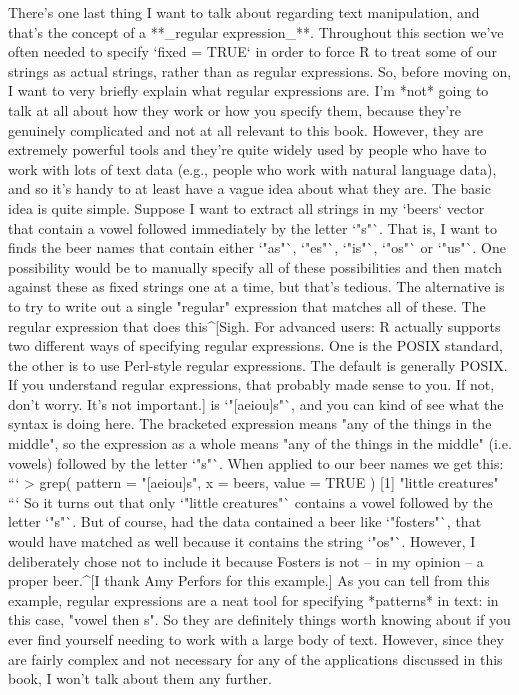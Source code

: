 There's one last thing I want to talk about regarding text manipulation, and that's the concept of a **_regular expression_**. Throughout this section we've often needed to specify `fixed = TRUE` in order to force R to treat some of our strings as actual strings, rather than as regular expressions. So, before moving on, I want to very briefly explain what regular expressions are. I'm *not* going to talk at all about how they work or how you specify them, because they're genuinely complicated and not at all relevant to this book. However, they are extremely powerful tools and they're quite widely used by people who have to work with lots of text data (e.g., people who work with natural language data), and so it's handy to at least have a vague idea about what they are. The basic idea is quite simple. Suppose I want to extract all strings in my `beers` vector that contain a vowel followed immediately by the letter `"s"`. That is, I want to finds the beer names that contain either `"as"`, `"es"`, `"is"`, `"os"` or `"us"`. One possibility would be to manually specify all of these possibilities and then match against these as fixed strings one at a time, but that's tedious. The alternative is to try to write out a single "regular" expression that matches all of these. The regular expression that does this^[Sigh. For advanced users: R actually supports two different ways of specifying regular expressions. One is the POSIX standard, the other is to use Perl-style regular expressions. The default is generally POSIX. If you understand regular expressions, that probably made sense to you. If not, don't worry. It's not important.] is `"[aeiou]s"`, and you can kind of see what the syntax is doing here. The bracketed expression means "any of the things in the middle", so the expression as a whole means "any of the things in the middle" (i.e. vowels) followed by the letter `"s"`. When applied to our beer names we get this:
```
> grep( pattern = "[aeiou]s", x = beers, value = TRUE )
[1] "little creatures"
``` 
So it turns out that only `"little creatures"` contains a vowel followed by the letter `"s"`. But of course, had the data contained a beer like `"fosters"`, that would have matched as well because it contains the string `"os"`. However, I deliberately chose not to include it because Fosters is not -- in my opinion -- a proper beer.^[I thank Amy Perfors for this example.] As you can tell from this example, regular expressions are a neat tool for specifying *patterns* in text: in this case, "vowel then s". So they are definitely things worth knowing about if you ever find yourself needing to work with a large body of text. However, since they are fairly complex and not necessary for any of the applications discussed in this book, I won't talk about them any further. 


